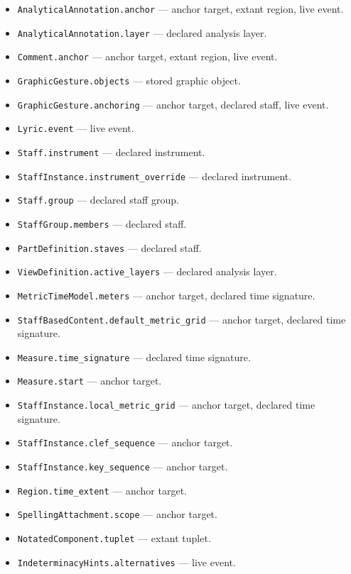 \documentclass[11pt,letterpaper]{report}
\newcounter{requirement}[chapter]
\begin{document}
\begin{requirement}
\begin{enumerate}
\begin{itemize}
        \item \texttt{AnalyticalAnnotation.anchor} --- anchor target, extant region, live event.
        \item \texttt{AnalyticalAnnotation.layer} --- declared analysis layer.
        \item \texttt{Comment.anchor} --- anchor target, extant region, live event.
        \item \texttt{GraphicGesture.objects} --- stored graphic object.
        \item \texttt{GraphicGesture.anchoring} --- anchor target, declared staff, live event.
        \item \texttt{Lyric.event} --- live event.
        \item \texttt{Staff.instrument} --- declared instrument.
        \item \texttt{StaffInstance.instrument\_override} --- declared instrument.
        \item \texttt{Staff.group} --- declared staff group.
        \item \texttt{StaffGroup.members} --- declared staff.
        \item \texttt{PartDefinition.staves} --- declared staff.
        \item \texttt{ViewDefinition.active\_layers} --- declared analysis layer.
        \item \texttt{MetricTimeModel.meters} --- anchor target, declared time signature.
        \item \texttt{StaffBasedContent.default\_metric\_grid} --- anchor target, declared time signature.
        \item \texttt{Measure.time\_signature} --- declared time signature.
        \item \texttt{Measure.start} --- anchor target.
        \item \texttt{StaffInstance.local\_metric\_grid} --- anchor target, declared time signature.
        \item \texttt{StaffInstance.clef\_sequence} --- anchor target.
        \item \texttt{StaffInstance.key\_sequence} --- anchor target.
        \item \texttt{Region.time\_extent} --- anchor target.
        \item \texttt{SpellingAttachment.scope} --- anchor target.
        \item \texttt{NotatedComponent.tuplet} --- extant tuplet.
        \item \texttt{IndeterminacyHints.alternatives} --- live event.

\end{itemize}
\end{enumerate}
\end{requirement}
\end{document}
